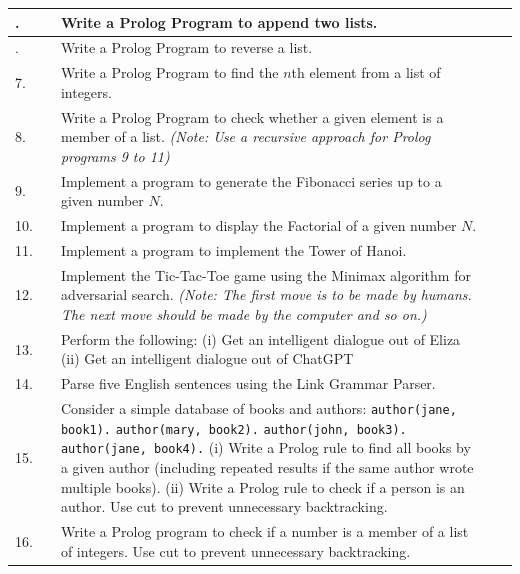 \documentclass[11pt, a4paper]{article}
\begin{document}
\begin{longtable}{
  |>{\centering\arraybackslash}p{0.7cm}
  |>{\centering\arraybackslash}p{1.7cm}
  |>{\arraybackslash}p{9.3cm}
  |>{\centering\arraybackslash}p{1.3cm}
  |>{\centering\arraybackslash}p{2.2cm}|
}
5. & &
Write a Prolog Program to append two lists.
& & \\
\hline

6. & &
Write a Prolog Program to reverse a list.
& & \\
\hline

7. & &
Write a Prolog Program to find the $n$th element from a list of integers.
& & \\
\hline

8. & &
Write a Prolog Program to check whether a given element is a member of a list.\newline
\textit{(Note: Use a recursive approach for Prolog programs 9 to 11)}
& & \\
\hline

9. & &
Implement a program to generate the Fibonacci series up to a given number $N$.
& & \\
\hline

10. & &
Implement a program to display the Factorial of a given number $N$.
& & \\
\hline

11. & &
Implement a program to implement the Tower of Hanoi.
& & \\
\hline

12. & &
Implement the Tic-Tac-Toe game using the Minimax algorithm for adversarial search. \textit{(Note: The first move is to be made by humans. The next move should be made by the computer and so on.)}
& & \\
\hline

13. & &
Perform the following:\newline
\quad (i)  Get an intelligent dialogue out of Eliza\newline
\quad (ii) Get an intelligent dialogue out of ChatGPT
& & \\
\hline

14. & &
Parse five English sentences using the Link Grammar Parser.
& & \\
\hline

15. & &
Consider a simple database of books and authors:\newline
\texttt{author(jane, book1).}\newline
\texttt{author(mary, book2).}\newline
\texttt{author(john, book3).}\newline
\texttt{author(jane, book4).}\newline
\quad (i)  Write a Prolog rule to find all books by a given author (including repeated results if the same author wrote multiple books).\newline
\quad (ii) Write a Prolog rule to check if a person is an author. Use cut to prevent unnecessary backtracking.
& & \\
\hline

16. & &
Write a Prolog program to check if a number is a member of a list of integers. Use cut to prevent unnecessary backtracking.
& & \\
\hline

\end{longtable}
\end{document}
